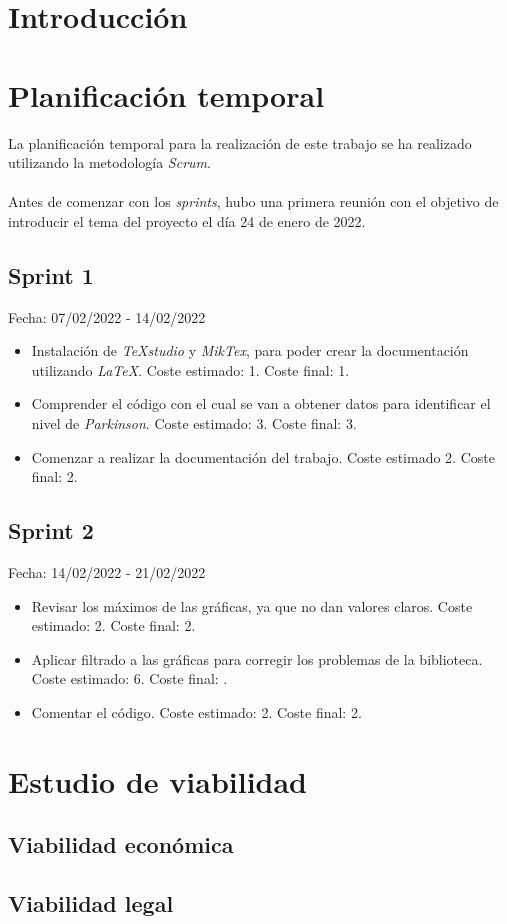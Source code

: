 
\section{Introducción}

\section{Planificación temporal}
La planificación temporal para la realización de este trabajo se ha realizado utilizando la metodología \textit{Scrum}.\\
\\
Antes de comenzar con los \textit{sprints}, hubo una primera reunión con el objetivo de introducir el tema del proyecto el día 24 de enero de 2022.

\subsection{Sprint 1}
Fecha: 07/02/2022 - 14/02/2022
\begin{itemize}
	\item Instalación de \textit{TeXstudio} y \textit{MikTex}, para poder crear la documentación utilizando \textit{LaTeX}. Coste estimado: 1. Coste final: 1.
	\item Comprender el código con el cual se van a obtener datos para identificar el nivel de \textit{Parkinson}. Coste estimado: 3. Coste final: 3.
	\item Comenzar a realizar la documentación del trabajo. Coste estimado 2. Coste final: 2.
\end{itemize}

\subsection{Sprint 2}
Fecha: 14/02/2022 - 21/02/2022
\begin{itemize}
	\item Revisar los máximos de las gráficas, ya que no dan valores claros. Coste estimado: 2. Coste final: 2. 
	\item Aplicar filtrado a las gráficas para corregir los problemas de la biblioteca. Coste estimado: 6. Coste final: .
	\item Comentar el código. Coste estimado: 2. Coste final: 2.
\end{itemize}

\section{Estudio de viabilidad}

\subsection{Viabilidad económica}

\subsection{Viabilidad legal}
